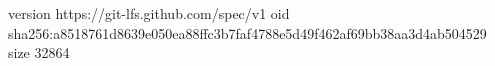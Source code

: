 version https://git-lfs.github.com/spec/v1
oid sha256:a8518761d8639e050ea88ffc3b7faf4788e5d49f462af69bb38aa3d4ab504529
size 32864
